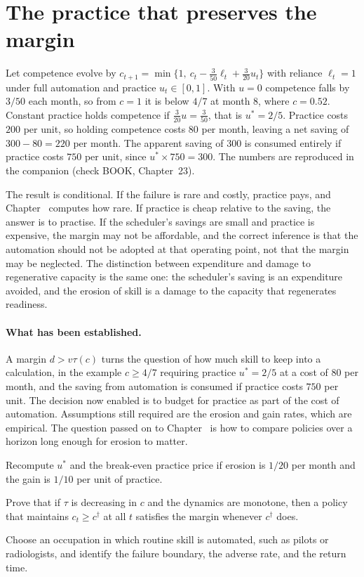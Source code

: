 \section{The practice that preserves the margin}

Let competence evolve by $c_{t+1}=\min\{1,\ c_t-\tfrac{3}{50}\ell_t+\tfrac{3}{20}u_t\}$ with reliance $\ell_t=1$ under full automation and practice $u_t\in[0,1]$. With $u=0$ competence falls by $3/50$ each month, so from $c=1$ it is below $4/7$ at month $8$, where $c=0.52$. Constant practice holds competence if $\tfrac{3}{20}u=\tfrac{3}{50}$, that is $u^*=2/5$. Practice costs $200$ per unit, so holding competence costs $80$ per month, leaving a net saving of $300-80=220$ per month. The apparent saving of $300$ is consumed entirely if practice costs $750$ per unit, since $u^*\times 750=300$. The numbers are reproduced in the companion (check BOOK, Chapter~23).

The result is conditional. If the failure is rare and costly, practice pays, and Chapter~ computes how rare. If practice is cheap relative to the saving, the answer is to practise. If the scheduler's savings are small and practice is expensive, the margin may not be affordable, and the correct inference is that the automation should not be adopted at that operating point, not that the margin may be neglected. The distinction between expenditure and damage to regenerative capacity is the same one: the scheduler's saving is an expenditure avoided, and the erosion of skill is a damage to the capacity that regenerates readiness.

\paragraph{What has been established.} A margin $d>v\tau(c)$ turns the question of how much skill to keep into a calculation, in the example $c\ge 4/7$ requiring practice $u^*=2/5$ at a cost of $80$ per month, and the saving from automation is consumed if practice costs $750$ per unit. The decision now enabled is to budget for practice as part of the cost of automation. Assumptions still required are the erosion and gain rates, which are empirical. The question passed on to Chapter~ is how to compare policies over a horizon long enough for erosion to matter.

\begin{exercise}
Recompute $u^*$ and the break-even practice price if erosion is $1/20$ per month and the gain is $1/10$ per unit of practice.
\end{exercise}
\begin{exercise}
Prove that if $\tau$ is decreasing in $c$ and the dynamics are monotone, then a policy that maintains $c_t\ge c^\dagger$ at all $t$ satisfies the margin whenever $c^\dagger$ does.
\end{exercise}
\begin{exercise}
Choose an occupation in which routine skill is automated, such as pilots or radiologists, and identify the failure boundary, the adverse rate, and the return time.
\end{exercise}

